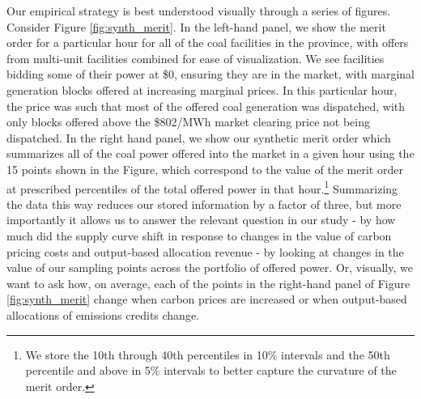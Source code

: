 \documentclass[12pt]{article}
\begin{document}
Our empirical strategy is best understood visually through a series of figures. Consider Figure \ref{fig:synth_merit}. In the left-hand panel, we show the merit order for a particular hour for all of the coal facilities in the province, with offers from multi-unit facilities combined for ease of visualization. We see facilities bidding some of their power at \$0, ensuring they are in the market, with marginal generation blocks offered at increasing marginal prices. In this particular hour, the price was such that most of the offered coal generation was dispatched, with only blocks offered above the \$802/MWh market clearing price not being dispatched. In the right hand panel, we show our synthetic merit order which summarizes all of the coal power offered into the market in a given hour using the 15 points shown in the Figure, which correspond to the value of the merit order at prescribed percentiles of the total offered power in that hour.\footnote{We store the 10th through 40th percentiles in 10\% intervals and the 50th percentile and above in 5\% intervals to better capture the curvature of the merit order.} Summarizing the data this way reduces our stored information by a factor of three, but more importantly it allows us to answer the relevant question in our study - by how much did the supply curve shift in response to changes in the value of carbon pricing costs and output-based allocation revenue - by looking at changes in the value of our sampling points across the portfolio of offered power. Or, visually, we want to ask how, on average, each of the points in the right-hand panel of Figure \ref{fig:synth_merit} change when carbon prices are increased or when output-based allocations of emissions credits change.
\end{document}
